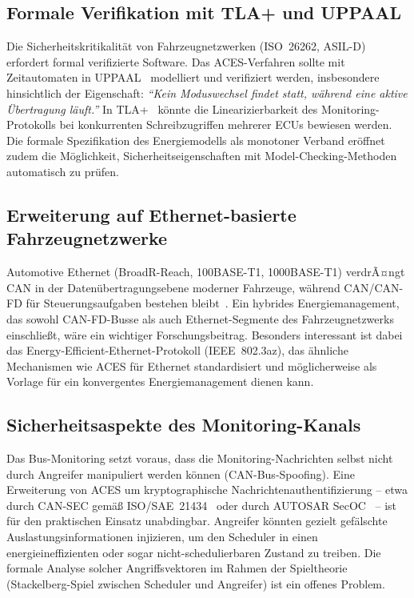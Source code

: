﻿\documentclass[a4paper,12pt]{article}
\theoremstyle{definition}
\begin{document}
\subsection{Formale Verifikation mit TLA+ und UPPAAL}

Die Sicherheitskritikalit\"{a}t von Fahrzeugnetzwerken (ISO~26262, ASIL-D)
erfordert formal verifizierte Software.
Das ACES-Verfahren sollte mit Zeitautomaten in UPPAAL~\cite{uppaal} modelliert
und verifiziert werden, insbesondere hinsichtlich der Eigenschaft:
\emph{``Kein Moduswechsel findet statt, w\"{a}hrend eine aktive \"{U}bertragung l\"{a}uft.''}
In TLA+~\cite{lamport_tla} k\"{o}nnte die Linearizierbarkeit des Monitoring-Protokolls
bei konkurrenten Schreibzugriffen mehrerer ECUs bewiesen werden.
Die formale Spezifikation des Energiemodells als monotoner Verband er\"{o}ffnet
zudem die M\"{o}glichkeit, Sicherheitseigenschaften mit Model-Checking-Methoden
automatisch zu pr\"{u}fen.

\subsection{Erweiterung auf Ethernet-basierte Fahrzeugnetzwerke}

Automotive Ethernet (BroadR-Reach, 100BASE-T1, 1000BASE-T1) verdrÃ¤ngt CAN in
der Daten\"{u}bertragungsebene moderner Fahrzeuge, w\"{a}hrend CAN/CAN-FD f\"{u}r
Steuerungsaufgaben bestehen bleibt~\cite{ieee802_3bw}.
Ein hybrides Energiemanagement, das sowohl CAN-FD-Busse als auch
Ethernet-Segmente des Fahrzeugnetzwerks einschlie\ss{}t, w\"{a}re ein wichtiger
Forschungsbeitrag.
Besonders interessant ist dabei das Energy-Efficient-Ethernet-Protokoll (IEEE~802.3az),
das \"{a}hnliche Mechanismen wie ACES f\"{u}r Ethernet standardisiert und
m\"{o}glicherweise als Vorlage f\"{u}r ein konvergentes Energiemanagement
dienen kann.

\subsection{Sicherheitsaspekte des Monitoring-Kanals}

Das Bus-Monitoring setzt voraus, dass die Monitoring-Nachrichten selbst nicht
durch Angreifer manipuliert werden k\"{o}nnen (CAN-Bus-Spoofing).
Eine Erweiterung von ACES um kryptographische Nachrichtenauthentifizierung
-- etwa durch CAN-SEC gem\"{a}\ss{} ISO/SAE~21434~\cite{iso21434}
oder durch AUTOSAR SecOC~\cite{autosar_secoc} -- ist f\"{u}r den praktischen Einsatz
unabdingbar.
Angreifer k\"{o}nnten gezielt gef\"{a}lschte Auslastungsinformationen
injizieren, um den Scheduler in einen energieineffizienten oder sogar
nicht-schedulierbaren Zustand zu treiben.
Die formale Analyse solcher Angriffsvektoren im Rahmen der Spieltheorie
(Stackelberg-Spiel zwischen Scheduler und Angreifer) ist ein offenes Problem.
\end{document}
